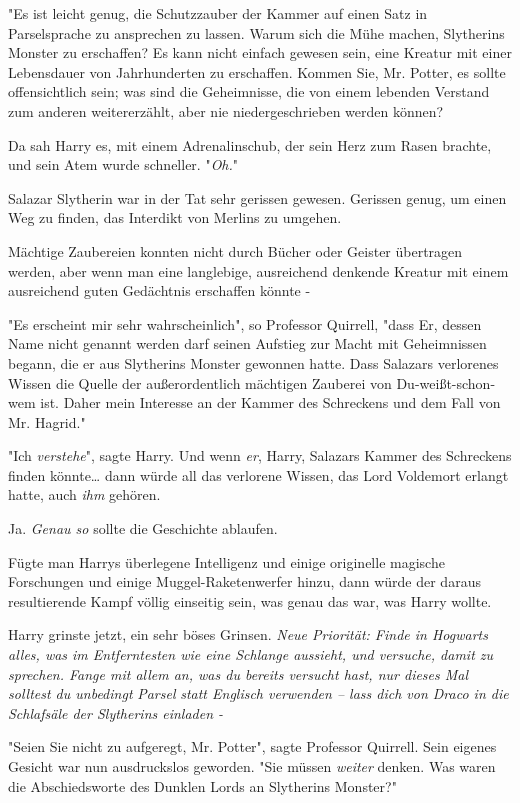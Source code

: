 {"Es ist leicht genug, die Schutzzauber der Kammer auf einen Satz in Parselsprache zu ansprechen zu lassen. Warum sich die Mühe machen, Slytherins Monster zu erschaffen? Es kann nicht einfach gewesen sein, eine Kreatur mit einer Lebensdauer von Jahrhunderten zu erschaffen. Kommen Sie, Mr. Potter, es sollte offensichtlich sein; was sind die Geheimnisse, die von einem lebenden Verstand zum anderen weitererzählt, aber nie niedergeschrieben werden können?

Da sah Harry es, mit einem Adrenalinschub, der sein Herz zum Rasen brachte, und sein Atem wurde schneller. "\emph{Oh.}"

Salazar Slytherin war in der Tat sehr gerissen gewesen. Gerissen genug, um einen Weg zu finden, das Interdikt von Merlins zu umgehen.

Mächtige Zaubereien konnten nicht durch Bücher oder Geister übertragen werden, aber wenn man eine langlebige, ausreichend denkende Kreatur mit einem ausreichend guten Gedächtnis erschaffen könnte -

"Es erscheint mir sehr wahrscheinlich", so Professor Quirrell, "dass Er, dessen Name nicht genannt werden darf seinen Aufstieg zur Macht mit Geheimnissen begann, die er aus Slytherins Monster gewonnen hatte. Dass Salazars verlorenes Wissen die Quelle der außerordentlich mächtigen Zauberei von Du-weißt-schon-wem ist. Daher mein Interesse an der Kammer des Schreckens und dem Fall von Mr. Hagrid."

"Ich \emph{verstehe}", sagte Harry. Und wenn \emph{er}, Harry, Salazars Kammer des Schreckens finden könnte… dann würde all das verlorene Wissen, das Lord Voldemort erlangt hatte, auch \emph{ihm} gehören.

Ja. \emph{Genau so} sollte die Geschichte ablaufen.

Fügte man Harrys überlegene Intelligenz und einige originelle magische Forschungen und einige Muggel-Raketenwerfer hinzu, dann würde der daraus resultierende Kampf völlig einseitig sein, was genau das war, was Harry wollte.

Harry grinste jetzt, ein sehr böses Grinsen. \emph{Neue Priorität: Finde in Hogwarts alles, was im Entferntesten wie eine Schlange aussieht, und versuche, damit zu sprechen. Fange mit allem an, was du bereits versucht hast, nur dieses Mal solltest du unbedingt} \emph{Parsel} \emph{statt Englisch verwenden -- lass dich von Draco in die Schlafsäle der Slytherins einladen -}

"Seien Sie nicht zu aufgeregt, Mr. Potter", sagte Professor Quirrell. Sein eigenes Gesicht war nun ausdruckslos geworden. "Sie müssen \emph{weiter} denken. Was waren die Abschiedsworte des Dunklen Lords an Slytherins Monster?"

}
